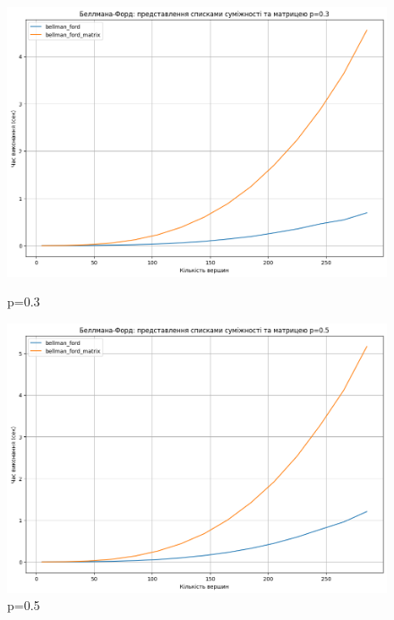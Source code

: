 \documentclass[a4paper,12pt]{article}
\begin{document}
\begin{figure}[ht]
    \centering
    \begin{minipage}{0.45\textwidth}
        \centering
        \includegraphics[width=\textwidth]{img/bellman03.png}
        \caption{p=0.3}
        \label{fig:bellman03}
    \end{minipage}
    \hfill
    \begin{minipage}{0.45\textwidth}
        \centering
        \includegraphics[width=\textwidth]{img/bellman05.png}
        \caption{p=0.5}
        \label{fig:bellman05}
    \end{minipage}
    

\end{figure}
\end{document}
